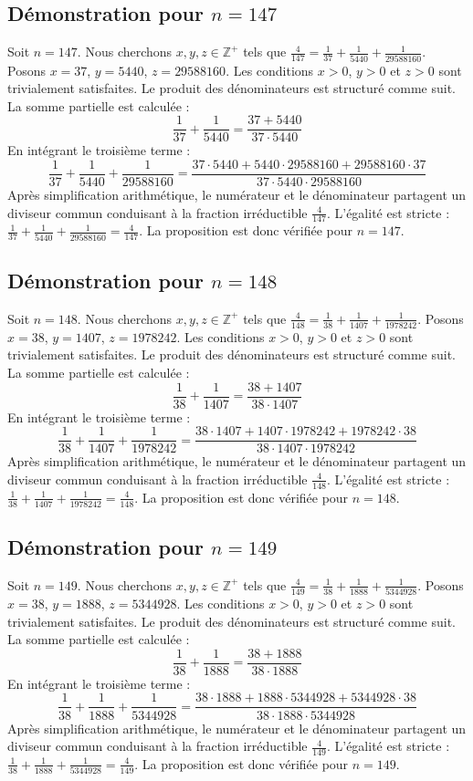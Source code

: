 \documentclass[11pt,a4paper]{article}
\begin{document}
\subsection{Démonstration pour $n = 147$}
Soit $n = 147$. Nous cherchons $x, y, z \in \mathbb{Z}^{+}$ tels que $\frac{4}{147} = \frac{1}{37} + \frac{1}{5440} + \frac{1}{29588160}$.
Posons $x = 37$, $y = 5440$, $z = 29588160$.
Les conditions $x > 0$, $y > 0$ et $z > 0$ sont trivialement satisfaites.
Le produit des dénominateurs est structuré comme suit. La somme partielle est calculée :
$$ \frac{1}{37} + \frac{1}{5440} = \frac{37+5440}{37 \cdot 5440} $$
En intégrant le troisième terme :
$$ \frac{1}{37} + \frac{1}{5440} + \frac{1}{29588160} = \frac{37 \cdot 5440 + 5440 \cdot 29588160 + 29588160 \cdot 37}{37 \cdot 5440 \cdot 29588160} $$
Après simplification arithmétique, le numérateur et le dénominateur partagent un diviseur commun conduisant à la fraction irréductible $\frac{4}{147}$.
L'égalité est stricte : $\frac{1}{37} + \frac{1}{5440} + \frac{1}{29588160} = \frac{4}{147}$.
La proposition est donc vérifiée pour $n = 147$.
\subsection{Démonstration pour $n = 148$}
Soit $n = 148$. Nous cherchons $x, y, z \in \mathbb{Z}^{+}$ tels que $\frac{4}{148} = \frac{1}{38} + \frac{1}{1407} + \frac{1}{1978242}$.
Posons $x = 38$, $y = 1407$, $z = 1978242$.
Les conditions $x > 0$, $y > 0$ et $z > 0$ sont trivialement satisfaites.
Le produit des dénominateurs est structuré comme suit. La somme partielle est calculée :
$$ \frac{1}{38} + \frac{1}{1407} = \frac{38+1407}{38 \cdot 1407} $$
En intégrant le troisième terme :
$$ \frac{1}{38} + \frac{1}{1407} + \frac{1}{1978242} = \frac{38 \cdot 1407 + 1407 \cdot 1978242 + 1978242 \cdot 38}{38 \cdot 1407 \cdot 1978242} $$
Après simplification arithmétique, le numérateur et le dénominateur partagent un diviseur commun conduisant à la fraction irréductible $\frac{4}{148}$.
L'égalité est stricte : $\frac{1}{38} + \frac{1}{1407} + \frac{1}{1978242} = \frac{4}{148}$.
La proposition est donc vérifiée pour $n = 148$.
\subsection{Démonstration pour $n = 149$}
Soit $n = 149$. Nous cherchons $x, y, z \in \mathbb{Z}^{+}$ tels que $\frac{4}{149} = \frac{1}{38} + \frac{1}{1888} + \frac{1}{5344928}$.
Posons $x = 38$, $y = 1888$, $z = 5344928$.
Les conditions $x > 0$, $y > 0$ et $z > 0$ sont trivialement satisfaites.
Le produit des dénominateurs est structuré comme suit. La somme partielle est calculée :
$$ \frac{1}{38} + \frac{1}{1888} = \frac{38+1888}{38 \cdot 1888} $$
En intégrant le troisième terme :
$$ \frac{1}{38} + \frac{1}{1888} + \frac{1}{5344928} = \frac{38 \cdot 1888 + 1888 \cdot 5344928 + 5344928 \cdot 38}{38 \cdot 1888 \cdot 5344928} $$
Après simplification arithmétique, le numérateur et le dénominateur partagent un diviseur commun conduisant à la fraction irréductible $\frac{4}{149}$.
L'égalité est stricte : $\frac{1}{38} + \frac{1}{1888} + \frac{1}{5344928} = \frac{4}{149}$.
La proposition est donc vérifiée pour $n = 149$.
\end{document}

